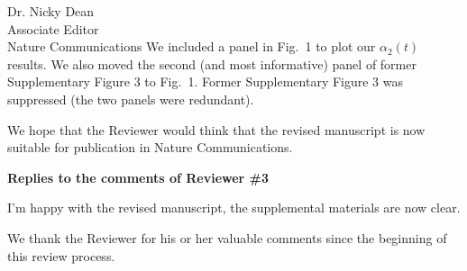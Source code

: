 \documentclass[a4paper, rebuttal, parskip=true, firsthead=false, fromemail=true, foldmarks=false]{scrlttr2}
\begin{document}
\begin{letter}{Dr. Nicky Dean\\
Associate Editor\\
Nature Communications}
We included a panel in Fig.~1 to plot our $\alpha_2(t)$ results. We also moved the second (and most informative) panel of former Supplementary Figure 3 to Fig.~1. Former Supplementary Figure 3 was suppressed (the two panels were redundant).

We hope that the Reviewer would think that the revised manuscript is now suitable for publication in Nature Communications. 

\clearpage
\textbf{Replies to the comments of Reviewer \#3}
\begin{quotationi}
I'm happy with the revised manuscript, the supplemental materials are now clear.
\end{quotationi}

We thank the Reviewer for his or her valuable comments since the beginning of this review process.

\end{letter} 
\end{document}
